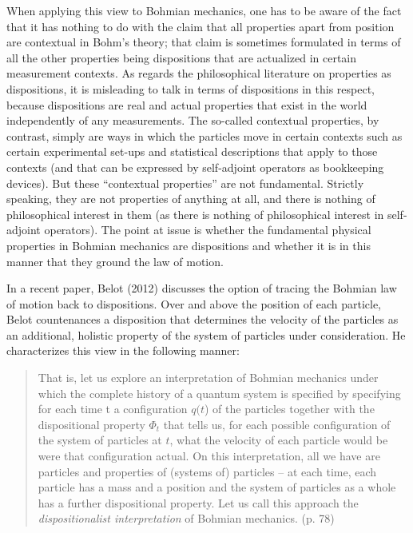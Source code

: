 \documentclass[12pt]{article}
\theoremstyle{definition}
\begin{document}
When applying this view to Bohmian mechanics, one has to be aware of the fact that it has nothing to do with the claim that all properties apart from position are contextual in Bohm's theory; that claim is sometimes formulated in terms of all the other properties being dispositions that are actualized in certain measurement contexts. As regards the philosophical literature on properties as dispositions, it is misleading to talk in terms of dispositions in this respect, because dispositions are real and actual properties that exist in the world independently of any measurements. The so-called contextual properties, by contrast, simply are ways in which the particles move in certain contexts such as certain experimental set-ups and statistical descriptions that apply to those contexts (and that can be expressed by self-adjoint operators as bookkeeping devices). But these ``contextual properties'' are not fundamental. Strictly speaking, they are not properties of anything at all, and there is nothing of philosophical interest in them (as there is nothing of philosophical interest in self-adjoint operators). The point at issue is whether the fundamental physical properties in Bohmian mechanics are dispositions and whether it is in this manner that they ground the law of motion.

In a recent paper, Belot (2012) discusses the option of tracing the Bohmian law of motion back to dispositions. Over and above the position of each particle, Belot countenances a disposition that determines the velocity of the particles as an additional, holistic property of the system of particles under consideration. He characterizes this view in the following manner:

\begin{quote}That is, let us explore an interpretation of Bohmian mechanics under which the complete history of a quantum system is specified by specifying for each time t a configuration $q(t$) of the particles together with the dispositional property $\Phi_t$ that tells us, for each possible configuration of the system of particles at $t$, what the velocity of each particle would be were that configuration actual. On this interpretation, all we have are particles and properties of (systems of) particles -- at each time, each particle has a mass and a position and the system of particles as a whole has a further dispositional property. Let us call this approach the \emph{dispositionalist interpretation} of Bohmian mechanics. (p. 78)\end{quote}
\end{document}
